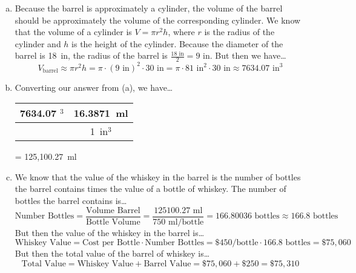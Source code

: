 \documentclass[11pt,letterpaper]{article}
\begin{document}
\sol 
\begin{enumerate}[(a)]
\item Because the barrel is approximately a cylinder, the volume of the barrel should be approximately the volume of the corresponding cylinder. We know that the volume of a cylinder is $V= \pi r^2 h$, where $r$ is the radius of the cylinder and $h$ is the height of the cylinder. Because the diameter of the barrel is 18~in, the radius of the barrel is $\frac{18 \text{ in}}{2}= 9 \text{ in}$. But then we have\dots
	\[
	V_{\text{barrel}} \approx \pi r^2 h= \pi \cdot (9 \text{ in})^2 \cdot 30 \text{ in}= \pi \cdot 81 \text{ in}^2 \cdot 30 \text{ in} \approx 7634.07 \text{ in}^3
	\] \pspace

\item Converting our answer from (a), we have\dots \par
	\begin{table}[H]
	\centering
	\begin{tabular}{c||c}
	7634.07 \text{ in}$^3$ & 16.3871~ml \\ \hline
				       & 1~in$^3$ 
	\end{tabular} = 125,100.27~ml
	\end{table} \pspace

\item We know that the value of the whiskey in the barrel is the number of bottles the barrel contains times the value of a bottle of whiskey. The number of bottles the barrel contains is\dots
	\[
	\text{Number Bottles}= \frac{\text{Volume Barrel}}{\text{Bottle Volume}}= \frac{125100.27 \text{ ml}}{750 \text{ ml/bottle}} = 166.80036 \text{ bottles} \approx 166.8 \text{ bottles}
	\] \pspace
But then the value of the whiskey in the barrel is\dots 
	\[
	\text{Whiskey Value}= \text{Cost per Bottle} \cdot \text{Number Bottles}= \$450 \text{/bottle} \cdot 166.8 \text{ bottles}= \$75,060
	\] 
But then the total value of the barrel of whiskey is\dots
	\[
	\text{Total Value}= \text{Whiskey Value} + \text{Barrel Value}= \$75,060 + \$250= \$75,310
	\]
\end{enumerate}
\end{document}
